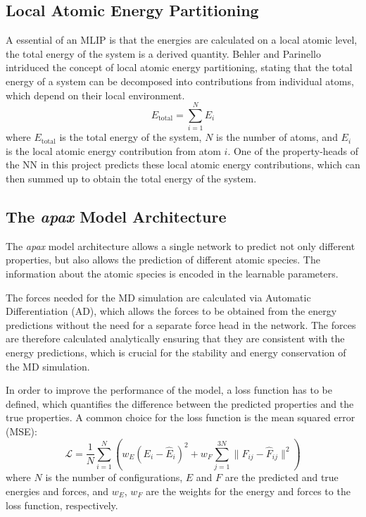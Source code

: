 \subsection{Local Atomic Energy Partitioning}
A essential of an MLIP is that the energies are calculated on a local atomic level, the total energy of the system is a derived quantity. Behler and Parinello intriduced the concept of local atomic energy partitioning, stating that the total energy of a system can be decomposed into contributions from individual atoms, which depend on their local environment.
\begin{equation}
    E_{\text{total}} = \sum_{i=1}^{N} E_{i}
\end{equation}
where \(E_{\text{total}}\) is the total energy of the system, \(N\) is the number of atoms, and \(E_{i}\) is the local atomic energy contribution from atom \(i\).
One of the property-heads of the NN in this project predicts these local atomic energy contributions, which can then summed up to obtain the total energy of the system.

\subsection{The \textit{apax} Model Architecture}
The \textit{apax} model architecture allows a single network to predict not only different properties, but also allows the prediction of different atomic species. The information about the atomic species is encoded in the learnable parameters.

The forces needed for the MD simulation are calculated via Automatic Differentiation (AD), which allows the forces to be obtained from the energy predictions without the need for a separate force head in the network. The forces are therefore calculated analytically ensuring that they are consistent with the energy predictions, which is crucial for the stability and energy conservation of the MD simulation.

In order to improve the performance of the model, a loss function has to be defined, which quantifies the difference between the predicted properties and the true properties. A common choice for the loss function is the mean squared error (MSE):
\begin{equation}
    \mathcal{L} = \frac{1}{N} \sum_{i=1}^{N} \left( w_E (E_i - \hat{E}_i)^2 + w_F \sum_{j=1}^{3N} \|F_{ij} - \hat{F}_{ij}\|^2 \right)
\end{equation}
where \(N\) is the number of configurations, \(E\) and \(F\) are the predicted and true energies and forces, and \(w_E\), \(w_F\) are the weights for the energy and forces to the loss function, respectively.

